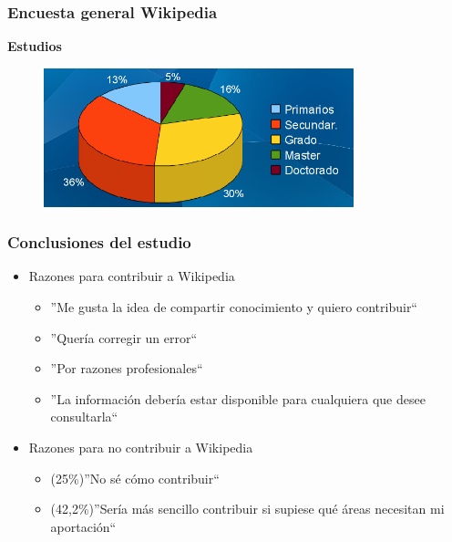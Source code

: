\begin{frame}
\frametitle{Encuesta general Wikipedia}

\large{\textbf{Estudios}}

\begin{figure}[htp]
\centering
\includegraphics[width=9cm]{figs/gsurv-estudios.png}
\end{figure}

\end{frame}


\begin{frame}
\frametitle{Conclusiones del estudio}

  \begin{itemize}
   \item Razones para contribuir a Wikipedia
   \begin{itemize}
    \item ''Me gusta la idea de compartir conocimiento y quiero contribuir``
    \item ''Quería corregir un error``
    \item ''Por razones profesionales``
    \item ''La información debería estar disponible para cualquiera que desee
consultarla``
   \end{itemize}
    \item Razones para no contribuir a Wikipedia
   \begin{itemize}
    \item \alert{(25\%)}''No sé cómo contribuir``
    \item \alert{(42,2\%)}''Sería más sencillo contribuir si supiese qué áreas necesitan
mi aportación``
   \end{itemize}
   \end{itemize}
    
\end{frame}


